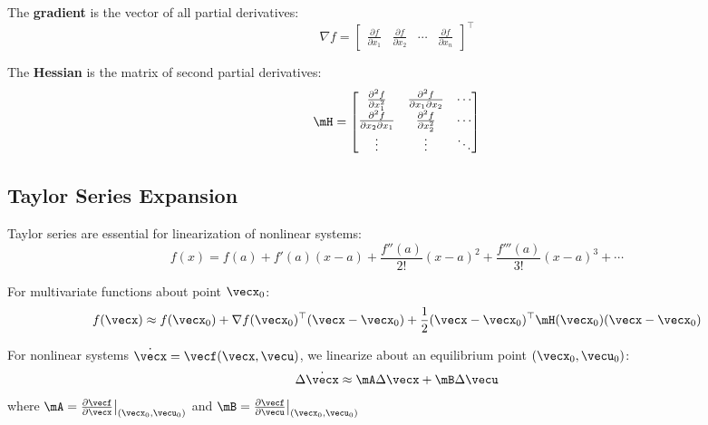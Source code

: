The \textbf{gradient} is the vector of all partial derivatives:
\begin{equation}
\nabla f = \begin{bmatrix} \frac{\partial f}{\partial x_1} & \frac{\partial f}{\partial x_2} & \cdots & \frac{\partial f}{\partial x_n} \end{bmatrix}^\top
\end{equation}

The \textbf{Hessian} is the matrix of second partial derivatives:
\begin{equation}
\mH = \begin{bmatrix}
\frac{\partial^2 f}{\partial x_1^2} & \frac{\partial^2 f}{\partial x_1 \partial x_2} & \cdots \\
\frac{\partial^2 f}{\partial x_2 \partial x_1} & \frac{\partial^2 f}{\partial x_2^2} & \cdots \\
\vdots & \vdots & \ddots
\end{bmatrix}
\end{equation}

\subsection{Taylor Series Expansion}

Taylor series are essential for linearization of nonlinear systems:
\begin{equation}
f(x) = f(a) + f'(a)(x-a) + \frac{f''(a)}{2!}(x-a)^2 + \frac{f'''(a)}{3!}(x-a)^3 + \cdots
\end{equation}

For multivariate functions about point $\vecx_0$:
\begin{equation}
f(\vecx) \approx f(\vecx_0) + \nabla f(\vecx_0)^\top (\vecx - \vecx_0) + \frac{1}{2}(\vecx - \vecx_0)^\top \mH(\vecx_0) (\vecx - \vecx_0)
\end{equation}

\begin{keyconceptbox}[title=Linearization in Control]
For nonlinear systems $\dot{\vecx} = \vecf(\vecx, \vecu)$, we linearize about an equilibrium point $(\vecx_0, \vecu_0)$:
\begin{equation}
\Delta\dot{\vecx} \approx \mA \Delta\vecx + \mB \Delta\vecu
\end{equation}
where $\mA = \frac{\partial \vecf}{\partial \vecx}\big|_{(\vecx_0, \vecu_0)}$ and $\mB = \frac{\partial \vecf}{\partial \vecu}\big|_{(\vecx_0, \vecu_0)}$
\end{keyconceptbox}

